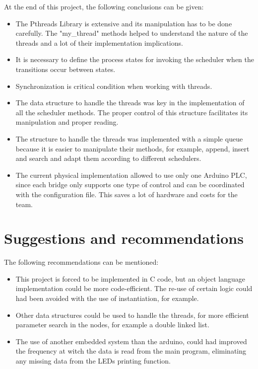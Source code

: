 \documentclass[a4paper,9pt]{article}
\begin{document}
At the end of this project, the following conclusions can be given:
\begin{itemize}


\item The Pthreads Library is extensive and its manipulation has to be done carefully. The "my\_thread" methods helped to understand the nature of the threads and a lot of their implementation implications.

\item It is necessary to define the process states for invoking the scheduler when the transitions occur between states.

\item Synchronization is critical condition when working with threads. 

\item The data structure to handle the threads was key in the implementation of all the scheduler methods. The proper control of this structure facilitates its manipulation and proper reading.

\item The structure to handle the threads was implemented with a simple queue because it is easier to manipulate their methods, for example, append, insert and search and adapt them according to different schedulers. 

\item The current physical implementation allowed to use only one Arduino PLC, since each bridge only supports one type of control and can be coordinated with the configuration file. This saves a lot of hardware and costs for the team.

\end{itemize}

\section{Suggestions and recommendations}
The following recommendations can be mentioned:
\begin{itemize}
\item This project is forced to be implemented in C code, but an object language implementation could be more code-efficient. The re-use of certain logic could had been avoided with the use of instantiation, for example. 

\item Other data structures could be used to handle the threads, for more efficient parameter search in the nodes, for example a double linked list. 

\item The use of another embedded system than the arduino, could had improved the frequency at witch the data is read from the main program, eliminating any missing data from the LEDs printing function. 
\end{itemize}

%
\printbibliography
\end{document}
